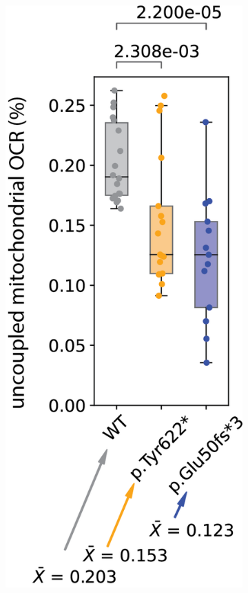 \begin{figure}[H]
\begin{subfigure}[t]{.2\textwidth}
            \includegraphics[width=\textwidth]{./main_plots/uncoupling.png}        

\end{subfigure}
\end{figure}
